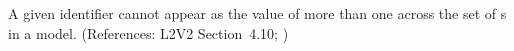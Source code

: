 A given identifier cannot appear as the value of more than one
  across the set of \InitialAssignment{}s in a model.
(References: L2V2 Section~4.10; )
